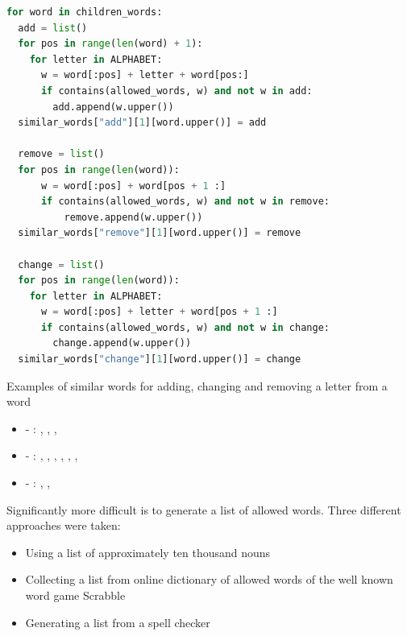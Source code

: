 \begin{lstlisting}[language=Python,caption={Algorithm to generate a list of similar words in Python},label={lst:similarWords}]
for word in children_words:
  add = list()
  for pos in range(len(word) + 1):
    for letter in ALPHABET:
      w = word[:pos] + letter + word[pos:]
      if contains(allowed_words, w) and not w in add:
        add.append(w.upper())
  similar_words["add"][1][word.upper()] = add

  remove = list()
  for pos in range(len(word)):
      w = word[:pos] + word[pos + 1 :]
      if contains(allowed_words, w) and not w in remove:
          remove.append(w.upper())
  similar_words["remove"][1][word.upper()] = remove

  change = list()
  for pos in range(len(word)):
    for letter in ALPHABET:
      w = word[:pos] + letter + word[pos + 1 :]
      if contains(allowed_words, w) and not w in change:
        change.append(w.upper())
  similar_words["change"][1][word.upper()] = change
\end{lstlisting}

\begin{example}
  Examples of similar words for adding, changing and removing a letter from a word
  \begin{itemize}
    \item {} - : , , , 
    \item {} - : , , , , , , 
    \item {} - : , , 
  \end{itemize}
\end{example}

Significantly more difficult is to generate a list of allowed words. Three different approaches were taken:

\begin{itemize}
  \item Using a list of approximately ten thousand nouns
  \item Collecting a list from online dictionary of allowed words of the well known word game Scrabble \cite{Scrabble}
  \item Generating a list from a spell checker
\end{itemize}

